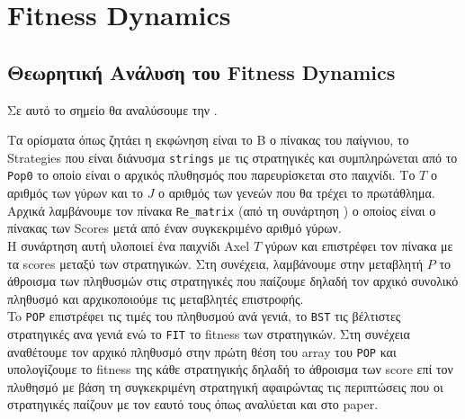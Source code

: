 \chapter{Fitness Dynamics}
\section{Θεωρητική Ανάλυση του Fitness Dynamics}
Σε αυτό το σημείο θα αναλύσουμε την   .



Τα ορίσματα όπως ζητάει η εκφώνηση είναι το B ο πίνακας του παίγνιου, το Strategies που είναι διάνυσμα \texttt{strings} με τις στρατηγικές και συμπληρώνεται από το \texttt{Pop0} το οποίο είναι ο αρχικός πλυθησμός που παρευρίσκεται στο παιχνίδι. Το \( Τ\) ο αριθμός των γύρων και το \(J\) ο αριθμός των γενεών που θα τρέχει το πρωτάθλημα.
Αρχικά λαμβάνουμε τον πίνακα \texttt{Re\_matrix} (από τη συνάρτηση  ) ο οποίος είναι ο πίνακας των Scores μετά από έναν συγκεκριμένο αριθμό γύρων. 
\\

Η συνάρτηση αυτή υλοποιεί ένα παιχνίδι Axel \(Τ\) γύρων και επιστρέφει τον πίνακα με τα scores μεταξύ των στρατηγικών. 
Στη συνέχεια, λαμβάνουμε στην μεταβλητή \(P\) το άθροισμα των πληθυσμών στις στρατηγικές που παίζουμε δηλαδή τον αρχικό συνολικό πληθυσμό και αρχικοποιούμε τις μεταβλητές επιστροφής.
\\

 To \texttt{POP} επιστρέφει τις τιμές του πληθυσμού ανά γενιά, το \texttt{BST} τις βέλτιστες στρατηγικές ανα γενιά ενώ το \texttt{FIT} το fitness των στρατηγικών. Στη συνέχεια αναθέτουμε τον αρχικό πληθυσμό στην πρώτη θέση του array του \texttt{POP} και υπολογίζουμε το fitness της κάθε στρατηγικής δηλαδή το άθροισμα των score επί τον πλυθησμό με βάση τη συγκεκριμένη στρατηγική αφαιρώντας τις περιπτώσεις που οι στρατηγικές παίζουν με τον εαυτό τους όπως αναλύεται και στο paper\cite{paper}.
\\

